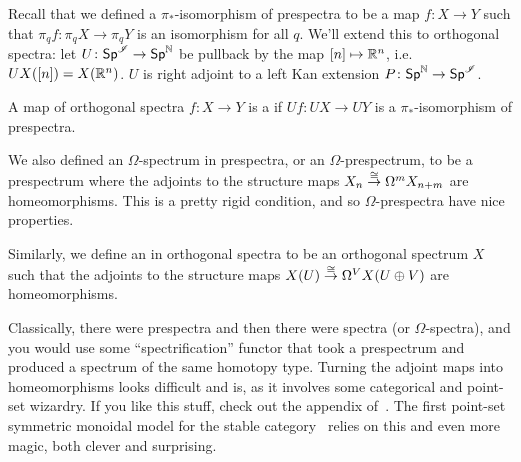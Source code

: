 Recall that we defined a $\pi_*$-isomorphism of prespectra to be a map $f\colon X\to Y$ such that $\pi_qf\colon
\pi_q X\to\pi_q Y$ is an isomorphism for all $q$. We'll extend this to orthogonal spectra: let
$U\colon\mathsf{Sp}^\mathscr I\to\mathsf{Sp}^\mathbb N$ be pullback by the map $[n]\mapsto\R^n$, i.e.\ $UX([n]) = X(\mathbb R^n)$. $U$ is right
adjoint to a left Kan extension $P\colon\mathsf{Sp}^\mathbb N\to\mathsf{Sp}^\mathscr I$.
\begin{defn}
A map of orthogonal spectra $f\colon X\to Y$ is a
 if $Uf\colon UX\to UY$ is
a $\pi_*$-isomorphism of prespectra.
\end{defn}
We also defined an $\Omega$-spectrum in prespectra, or an $\Omega$-prespectrum, to be a prespectrum where the
adjoints to the structure maps $X_n\stackrel\cong\to\Omega^mX_{n+m}$ are homeomorphisms. This is a pretty rigid condition,
and so $\Omega$-prespectra have nice properties.
\begin{defn}
Similarly, we define an  in orthogonal spectra to be an orthogonal spectrum $X$ such that
the adjoints to the structure maps $X(U)\stackrel\cong\to\Omega^V X(U\oplus V)$ are
homeomorphisms.
\end{defn}
Classically, there were prespectra and then there were spectra (or $\Omega$-spectra), and you would use some
``spectrification'' functor that took a prespectrum and produced a spectrum of the same homotopy type. Turning the
adjoint maps into homeomorphisms looks difficult and is, as it involves some categorical and point-set wizardry. If
you like this stuff, check out the appendix of~\cite{LMS}. The first point-set symmetric monoidal model for the
stable category~\cite{EKMM} relies on this and even more magic, both clever and surprising.
